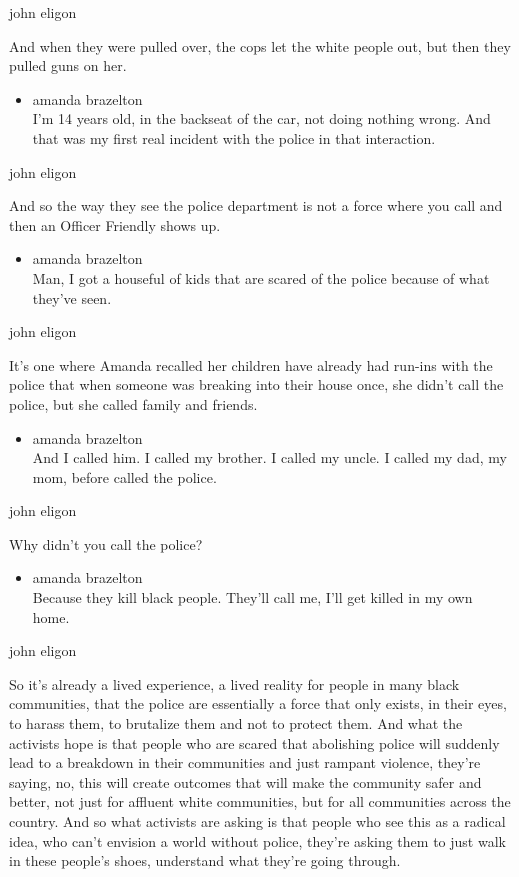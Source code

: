 john eligon

And when they were pulled over, the cops let the white people out, but
then they pulled guns on her.

\begin{itemize}
\tightlist
\item
  amanda brazelton\\
  I'm 14 years old, in the backseat of the car, not doing nothing wrong.
  And that was my first real incident with the police in that
  interaction.
\end{itemize}

john eligon

And so the way they see the police department is not a force where you
call and then an Officer Friendly shows up.

\begin{itemize}
\tightlist
\item
  amanda brazelton\\
  Man, I got a houseful of kids that are scared of the police because of
  what they've seen.
\end{itemize}

john eligon

It's one where Amanda recalled her children have already had run-ins
with the police that when someone was breaking into their house once,
she didn't call the police, but she called family and friends.

\begin{itemize}
\tightlist
\item
  amanda brazelton\\
  And I called him. I called my brother. I called my uncle. I called my
  dad, my mom, before called the police.
\end{itemize}

john eligon

Why didn't you call the police?

\begin{itemize}
\tightlist
\item
  amanda brazelton\\
  Because they kill black people. They'll call me, I'll get killed in my
  own home.
\end{itemize}

john eligon

So it's already a lived experience, a lived reality for people in many
black communities, that the police are essentially a force that only
exists, in their eyes, to harass them, to brutalize them and not to
protect them. And what the activists hope is that people who are scared
that abolishing police will suddenly lead to a breakdown in their
communities and just rampant violence, they're saying, no, this will
create outcomes that will make the community safer and better, not just
for affluent white communities, but for all communities across the
country. And so what activists are asking is that people who see this as
a radical idea, who can't envision a world without police, they're
asking them to just walk in these people's shoes, understand what
they're going through.

